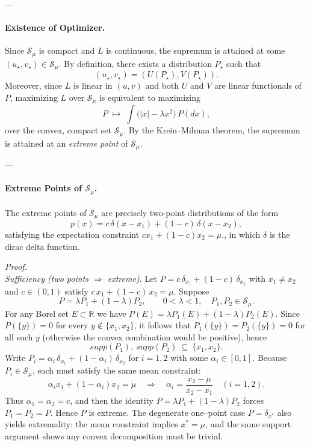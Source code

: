 \documentclass{article} %
\begin{document}
---

\paragraph{Existence of Optimizer.}  
Since $\mathcal{S}_\mu$ is compact and $L$ is continuous, the supremum is attained at some $(u_\star, v_\star) \in \mathcal{S}_\mu$. By definition, there exists a distribution $P_\star$ such that
\[
(u_\star, v_\star) = (U(P_\star), V(P_\star)).
\]
Moreover, since $L$ is linear in $(u,v)$ and both $U$ and $V$ are linear functionals of $P$, maximizing $L$ over $\mathcal{S}_\mu$ is equivalent to maximizing
\[
P \;\mapsto\; \int \big(|x| - \lambda x^2\big)\, P(dx),
\]
over the convex, compact set $\mathcal{S}_\mu$. By the Krein–Milman theorem, the supremum is attained at an \emph{extreme point} of $\mathcal{S}_\mu$.  

---


\paragraph{Extreme Points of $\mathcal{S}_\mu$.}  
The extreme points of $\mathcal{S}_\mu$ are precisely two-point distributions of the form
\[
p(x) = c \, \delta(x-x_1) + (1-c)\,\delta(x-x_2),
\]
satisfying the expectation constraint $c x_1 + (1-c) x_2 = \mu.$, in which $\delta$ is the dirac delta function.

\textit{Proof.}  \\
\medskip
\noindent\emph{Sufficiency (two points $\Rightarrow$ extreme).}
Let $P=c\,\delta_{x_1}+(1-c)\,\delta_{x_2}$ with $x_1\neq x_2$ and $c\in(0,1)$ satisfy $c\,x_1+(1-c)\,x_2=\mu$. Suppose
\[
P=\lambda P_1+(1-\lambda)P_2,\qquad 0<\lambda<1,\quad P_1,P_2\in\mathcal{S}_\mu.
\]
For any Borel set $E\subset\mathbb{R}$ we have $P(E)=\lambda P_1(E)+(1-\lambda)P_2(E)$. Since $P(\{y\})=0$ for every $y\notin\{x_1,x_2\}$, it follows that $P_1(\{y\})=P_2(\{y\})=0$ for all such $y$ (otherwise the convex combination would be positive), hence
\[
supp(P_1),\ supp(P_2)\ \subseteq\ \{x_1,x_2\}.
\]
Write $P_i=\alpha_i\,\delta_{x_1}+(1-\alpha_i)\,\delta_{x_2}$ for $i=1,2$ with some $\alpha_i\in[0,1]$. Because $P_i\in\mathcal{S}_\mu$, each must satisfy the same mean constraint:
\[
\alpha_i x_1 + (1-\alpha_i) x_2=\mu
\quad\Rightarrow\quad
\alpha_i=\frac{x_2-\mu}{x_2-x_1}\quad(i=1,2).
\]
Thus $\alpha_1=\alpha_2=c$, and then the identity $P=\lambda P_1+(1-\lambda)P_2$ forces $P_1=P_2=P$. Hence $P$ is extreme. 
The degenerate one–point case $P=\delta_{x^\ast}$ also yields extremality: the mean constraint implies $x^\ast=\mu$, and the same support argument shows any convex decomposition must be trivial.
\end{document}
